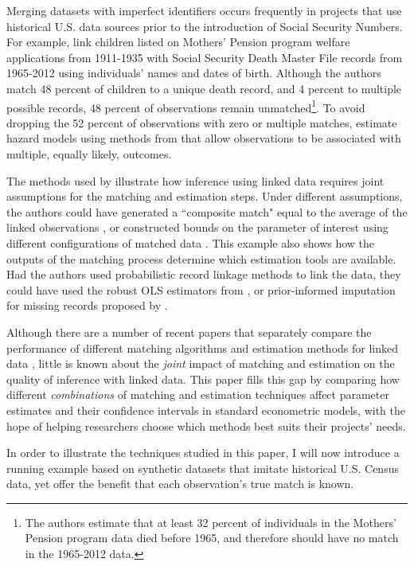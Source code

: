 \documentclass[12pt]{article}
\begin{document}
Merging datasets with imperfect identifiers occurs frequently in projects that use historical U.S. data sources prior to the introduction of Social Security Numbers.  For example, \cite{aizer2016} link children listed on Mothers' Pension program welfare applications from 1911-1935 with Social Security Death Master File records from 1965-2012 using individuals' names and dates of birth.  Although the authors match 48 percent of children to a unique death record, and 4 percent to multiple possible records, 48 percent of observations remain unmatched\footnote{The authors estimate that at least 32 percent of individuals in the Mothers' Pension program data died before 1965, and therefore should have no match in the 1965-2012 data.}.  To avoid dropping the 52 percent of observations with zero or multiple matches, \cite{aizer2016} estimate hazard models using methods from \cite{ahl2019} that allow observations to be associated with multiple, equally likely, outcomes.  

The methods used by \cite{aizer2016} illustrate how inference using linked data requires joint assumptions for the matching and estimation steps.  Under different assumptions, the authors could have generated a ``composite match" equal to the average of the linked observations \citep{bleakley2016}, or constructed bounds on the parameter of interest using different configurations of matched data \citep{nq2015}.   This example also shows how the outputs of the matching process determine which estimation tools are available.  Had the authors used probabilistic record linkage methods to link the data, they could have used the robust OLS estimators from \cite{lahiri05}, or prior-informed imputation for missing records proposed by \cite{Goldstein2012}.   

Although there are a number of recent papers that separately compare the performance of different matching algorithms  \citep{bailey2017, arp2018} and estimation methods for linked data \citep{harron2014}, little is known about the \textit{joint} impact of matching and estimation on the quality of inference with linked data.  This paper fills this gap by comparing how different \textit{combinations} of matching and estimation techniques affect parameter estimates and their confidence intervals in standard econometric models, with the hope of helping researchers choose which methods best suits their projects' needs. 

In order to illustrate the techniques studied in this paper, I will now introduce a running example based on synthetic datasets that imitate historical U.S. Census data, yet offer the benefit that each observation's true match is known.  
\end{document}
